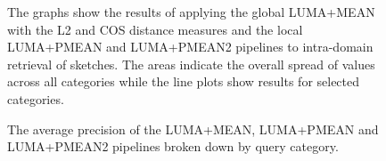 \begin{figure}[h]
    \centering
    
    \caption[Precision and Recall Results]{
        The graphs show the results of applying the global LUMA+MEAN with the
        L2 and COS distance measures and the local LUMA+PMEAN and LUMA+PMEAN2
        pipelines to intra-domain retrieval of sketches. The areas indicate the
        overall spread of values across all categories while the line plots
        show results for selected categories.
    }
    \label{fig:results_precision}
\end{figure}

\begin{figure}[h]
    \centering
    
    \caption[Average Precision by Category]{
        The average precision of the LUMA+MEAN, LUMA+PMEAN and LUMA+PMEAN2
        pipelines broken down by query category.
    }
    \label{fig:results_average_precision}
\end{figure}
\FloatBarrier
